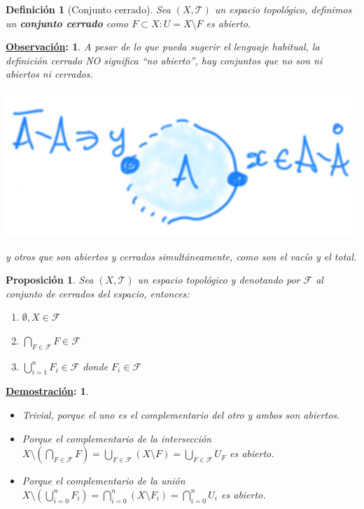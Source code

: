 \documentclass[10pt,a4paper,openright]{book}
\theoremstyle{break}
\newtheorem*{defi}{Definición}
\newtheorem*{prop}{Proposición}
\newtheorem*{demo}{\underline{Demostración}:}
\newtheorem*{obs}{\underline{Observación}:}
\begin{document}
\begin{defi}[Conjunto cerrado]
Sea $\left( X, \mathcal{T} \right)$ un espacio topológico, definimos un \textbf{conjunto cerrado} como $F \subset X : U = X \setminus F$ es abierto.
\end{defi}
\begin{obs}
A pesar de lo que pueda sugerir el lenguaje habitual, la definición cerrado NO significa ``no abierto'', hay conjuntos que no son ni abiertos ni cerrados.
    \begin{center}
        \includegraphics[scale=0.3]{images/def_cerrados} 
    \end{center}
y otros que son abiertos y cerrados simultáneamente, como son el vacío y el total.
\end{obs}

\begin{prop}
Sea $(X,\mathcal{T})$ un espacio topológico y denotando por $\mathcal{F}$ al conjunto de cerrados del espacio, entonces:
\begin{enumerate}
    \item $\emptyset, X \in \mathcal{F}$ 
    \item $\bigcap_{F \in \mathcal{F}} F \in \mathcal{F}$
    \item $\bigcup_{i=1}^n F_i \in \mathcal{F}$ donde $F_i \in \mathcal{F}$
\end{enumerate}
\end{prop}
\begin{demo}
\begin{itemize}
\item Trivial, porque el uno es el complementario del otro y ambos son abiertos.

\item Porque el complementario de la intersección $X\setminus \left(\bigcap_{F \in \mathcal{F}} F\right) = \bigcup_{F \in \mathcal{F}} \left( X \setminus F \right) = \bigcup_{F \in \mathcal{F}} U_F$ es abierto.

\item Porque el complementario de la unión $X\setminus \left(\bigcup_{i = 0}^n F_i\right) = \bigcap_{i=0}^n \left( X \setminus F_i\right) = \bigcap_{i=0}^n U_i$ es abierto.
\end{itemize}
\end{demo}
\end{document}
